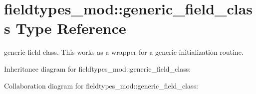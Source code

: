 \hypertarget{structfieldtypes__mod_1_1generic__field__class}{}\section{fieldtypes\+\_\+mod\+:\+:generic\+\_\+field\+\_\+class Type Reference}
\label{structfieldtypes__mod_1_1generic__field__class}


generic field class. This works as a wrapper for a generic initialization routine.  




Inheritance diagram for fieldtypes\+\_\+mod\+:\+:generic\+\_\+field\+\_\+class\+:


Collaboration diagram for fieldtypes\+\_\+mod\+:\+:generic\+\_\+field\+\_\+class\+:
